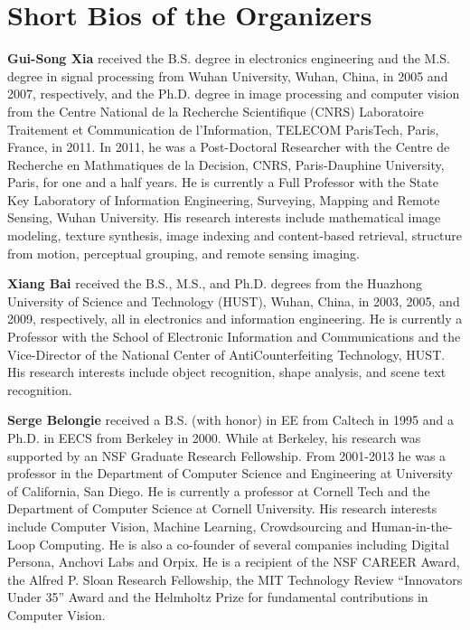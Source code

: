 \documentclass[a4paper]{article}
\begin{document}
\section{Short Bios of the Organizers}
\textbf{Gui-Song Xia} received the
B.S. degree in electronics engineering and the M.S.
degree in signal processing from Wuhan University,
Wuhan, China, in 2005 and 2007, respectively, and
the Ph.D. degree in image processing and computer
vision from the Centre National de la Recherche
Scientifique (CNRS) Laboratoire Traitement et
Communication de l’Information, TELECOM
ParisTech, Paris, France, in 2011.
In 2011, he was a Post-Doctoral Researcher
with the Centre de Recherche en Mathmatiques de
la Decision, CNRS, Paris-Dauphine University, Paris, for one and a half
years. He is currently a Full Professor with the State Key Laboratory of
Information Engineering, Surveying, Mapping and Remote Sensing, Wuhan
University. His research interests include mathematical image modeling,
texture synthesis, image indexing and content-based retrieval, structure from
motion, perceptual grouping, and remote sensing imaging.
\vspace{3mm}

\noindent\textbf{Xiang Bai} received the B.S., M.S., and
Ph.D. degrees from the Huazhong University of
Science and Technology (HUST), Wuhan, China, in
2003, 2005, and 2009, respectively, all in electronics
and information engineering.
He is currently a Professor with the School of
Electronic Information and Communications and
the Vice-Director of the National Center of AntiCounterfeiting
Technology, HUST. His research
interests include object recognition, shape analysis,
and scene text recognition.

\vspace{3mm}
\noindent\textbf{Serge Belongie} received a B.S. (with honor) in EE from Caltech in 1995 and a Ph.D. in EECS from Berkeley in 2000. While at Berkeley, his research was supported by an NSF Graduate
Research Fellowship. From 2001-2013 he was a professor in the Department of Computer
Science and Engineering at University of California, San Diego.
He is currently a professor at Cornell Tech and the Department of Computer Science at Cornell
University. His research interests include Computer Vision, Machine Learning, Crowdsourcing
and Human-in-the-Loop Computing. He is also a co-founder of several companies including
Digital Persona, Anchovi Labs and Orpix. He is a recipient of the NSF CAREER Award, the
Alfred P. Sloan Research Fellowship, the MIT Technology Review “Innovators Under 35”
Award and the Helmholtz Prize for fundamental contributions in Computer Vision.
\vspace{3mm}
\end{document}
